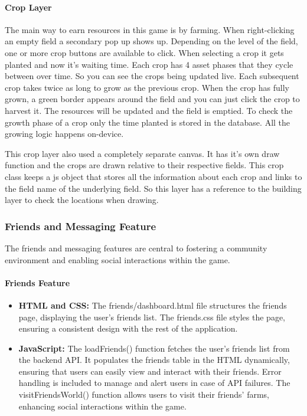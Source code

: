 \documentclass[12pt]{article}
\begin{document}
\paragraph{Crop Layer} The main way to earn resources in this game is by farming. When right-clicking an empty field a secondary pop up shows up.
Depending on the level of the field, one or more crop buttons are available to click. When selecting a crop it gets planted and now it's waiting time.
Each crop has 4 asset phases that they cycle between over time. So you can see the crops being updated live.
Each subsequent crop takes twice as long to grow as the previous crop. When the crop has fully grown,
a green border appears around the field and you can just click the crop to harvest it. The resources will be updated and the field is emptied.
To check the growth phase of a crop only the time planted is stored in the database. All the growing logic happens on-device.

This crop layer also used a completely separate canvas. It has it's own draw function and the crops are drawn relative to their respective fields.
This crop class keeps a js object that stores all the information about each crop and links to the field name of the underlying field.
So this layer has a reference to the building layer to check the locations when drawing.


\subsubsection{Friends and Messaging Feature}
The friends and messaging features are central to fostering a community environment and enabling social interactions within the game.
\paragraph{Friends Feature}
\begin{itemize}
    \item \textbf{HTML and CSS:} The friends/dashboard.html file structures the friends page, displaying the user's friends list. The friends.css file styles the page, ensuring a consistent design with the rest of the application.
    \item \textbf{JavaScript:} The loadFriends() function fetches the user's friends list from the backend API. It populates the friends table in the HTML dynamically, ensuring that users can easily view and interact with their friends. Error handling is included to manage and alert users in case of API failures. The visitFriendsWorld() function allows users to visit their friends' farms, enhancing social interactions within the game.
\end{itemize}
\end{document}
